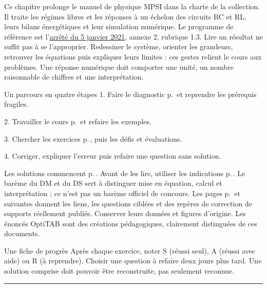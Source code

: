 \thispagestyle{mpsiFront}
Ce chapitre prolonge le manuel de physique MPSI dans la charte de la collection. Il traite les régimes libres et les réponses à un échelon des circuits RC et RL, leurs bilans énergétiques et leur simulation numérique. Le programme de référence est l’\href{https://www.education.gouv.fr/bo/21/Special1/ESRS2035779A.htm}{arrêté du 5 janvier 2021}, annexe 2, rubrique 1.3.
Lire un résultat ne suffit pas à se l’approprier. Redessiner le système, orienter les grandeurs, retrouver les équations puis expliquer leurs limites : ces gestes relient le cours aux problèmes. Une réponse numérique doit comporter une unité, un nombre raisonnable de chiffres et une interprétation.
\begin{loi}{Un parcours en quatre étapes}
1. Faire le diagnostic p.\,\pageref{diagnostic} et reprendre les prérequis fragiles.\par
2. Travailler le cours p.\,\pageref{cours-1} et refaire les exemples.\par
3. Chercher les exercices p.\,\pageref{td1}, puis les défis et évaluations.\par
4. Corriger, expliquer l’erreur puis refaire une question sans solution.
\end{loi}
Les solutions commencent p.\,\pageref{corr-diag}. Avant de les lire, utiliser les indications p.\,\pageref{indices}. Le barème du DM et du DS sert à distinguer mise en équation, calcul et interprétation ; ce n’est pas un barème officiel de concours.
Les pages p.\,\pageref{sources-1} et suivantes donnent les liens, les questions ciblées et des repères de correction de supports réellement publiés. Conserver leurs données et figures d’origine. Les énoncés OptiTAB sont des créations pédagogiques, clairement distinguées de ces documents.
\begin{methode}{Une fiche de progrès}
Après chaque exercice, noter S (réussi seul), A (réussi avec aide) ou R (à reprendre). Choisir une question à refaire deux jours plus tard. Une solution comprise doit pouvoir être reconstruite, pas seulement reconnue.
\end{methode}


\thispagestyle{mpsiFront}
\begingroup\setlength{\parskip}{0pt}\fontsize{10}{13.5}\selectfont
{}

\endgroup
\vspace{2mm}\hrule\vspace{2mm}



